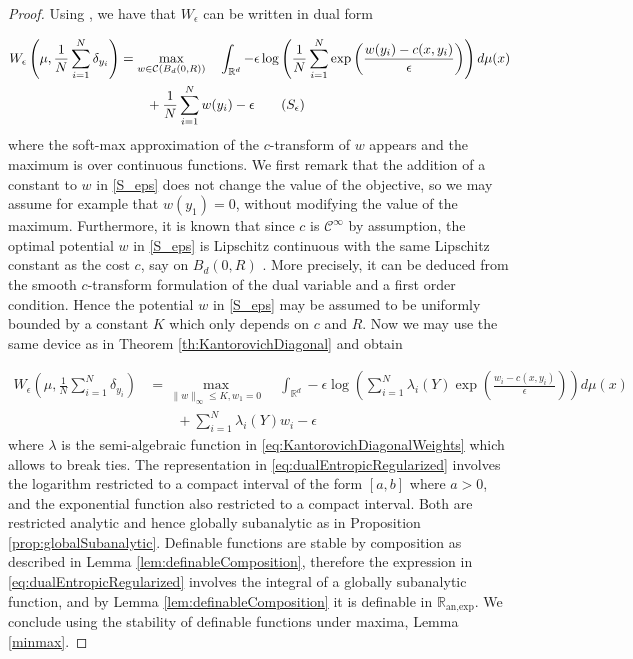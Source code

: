 \documentclass[11pt]{article}
\newcommand{\R}{\mathbb R}
\newcommand{\1}{\mathbbm{1}}
\numberwithin{equation}{section}
\begin{document}
\begin{proof}
Using \cite[Proposition 2.1]{Entropic}, we have that $W_{\epsilon}$ can be written in dual form

\begin{align}
	W_{\epsilon}\left(\mu, \frac{1}{N} \sum_{i=1}^N \delta_{y_i}\right)&=\underset{w\in \mathcal{C}(B_{d}(0,R))}{\max}\quad\int_{\R^{d}} -\epsilon\log\left(\frac{1}{N} \sum_{i=1}^N \exp\left(\frac{w(y_i)-c(x,y_i)}{\epsilon}\right)\right)d\mu(x) \nonumber\\
	&\qquad + \frac{1}{N} \sum_{i=1}^N w(y_i) -\epsilon \label{S_eps}\tag{$S_{\epsilon}$} 
\end{align}
	where the soft-max approximation of the $c$-transform of $w$ appears and the maximum is over continuous functions. We first remark that the addition of a constant to $w$ in \eqref{S_eps} does not change the value of the objective, so we may assume for example that $w(y_1) = 0$, without modifying the value of the maximum. Furthermore, it is known that since $c$ is $\mathcal{C}^\infty$ by assumption, the optimal potential $w$ in \eqref{S_eps} is Lipschitz continuous with the same Lipschitz constant as the cost $c$, say on $B_{d}(0,R)$ \cite[Proposition 1]{genevay2019sample}. More precisely, it can be deduced from the smooth $c$-transform formulation of the dual variable and a first order condition. Hence the potential $w$ in \eqref{S_eps} may be assumed to be uniformly bounded by a constant $K$ which only depends on $c$ and $R$. Now we may use the same device as in Theorem \ref{th:KantorovichDiagonal} and obtain 
 
 
\begin{align}
	W_{\epsilon}\left(\mu, \frac{1}{N} \sum_{i=1}^N \delta_{y_i}\right)&=\underset{\|w\|_\infty \leq K, w_1 = 0}{\max}\quad\int_{\R^{d}} -\epsilon\log\left(\sum_{i=1}^N \lambda_i(Y) \exp\left(\frac{w_i-c(x,y_i)}{\epsilon}\right)\right)d\mu(x) \nonumber\\
	&\qquad +  \sum_{i=1}^N \lambda_i(Y)w_i -\epsilon \label{eq:dualEntropicRegularized} 
\end{align}
where $\lambda$ is the semi-algebraic function in \eqref{eq:KantorovichDiagonalWeights} which allows to break ties.
The representation in \eqref{eq:dualEntropicRegularized} involves the logarithm restricted to a compact interval of the form $[a,b]$ where $a>0$, and the exponential function also restricted to a compact interval. Both are restricted analytic and hence globally subanalytic as in Proposition \ref{prop:globalSubanalytic}. Definable functions are stable by composition as described in Lemma \ref{lem:definableComposition}, therefore the expression in \eqref{eq:dualEntropicRegularized} involves the integral of a globally subanalytic function, and by Lemma \ref{lem:definableComposition} it is definable in $\R_{\text{an,exp}}$. We conclude using the stability of definable functions under maxima, Lemma \ref{minmax}.
\end{proof}
\end{document}
